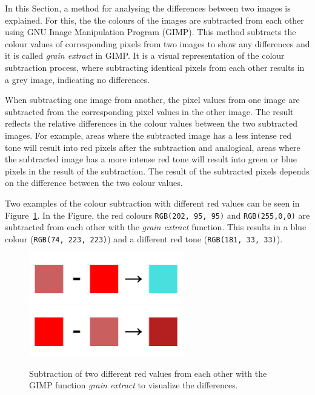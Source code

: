 \documentclass[../MasterThesis.tex]{subfiles}
\begin{document}
In this Section, a method for analysing the differences between two images is explained.
For this, the the colours of the images are subtracted from each other using GNU Image Manipulation Program (GIMP). 
This method subtracts the colour values of corresponding pixels from two images to show any differences and it is called \textit{grain extract} in GIMP. It is a visual representation of the colour subtraction process, where subtracting identical pixels from each other results in a grey image, indicating no differences.~\cite{gimp}


When subtracting one image from another, the pixel values from one image are subtracted from the corresponding pixel values in the other image. 
The result reflects the relative differences in the colour values between the two subtracted images. For example, areas where the subtracted image has a less intense red tone will result into red pixels after the subtraction and analogical, areas where the subtracted image has a more intense red tone will result into green or blue pixels in the result of the subtraction. The result of the subtracted pixels depends on the difference between the two colour values.

Two examples of the colour subtraction with different red values can be seen in Figure~\ref{figure:neonminuslight}. In the Figure, the red colours \texttt{RGB(202, 95, 95)} and \texttt{RGB(255,0,0)} are subtracted from each other with the \textit{grain extract} function. This results in a blue colour (\texttt{RGB(74, 223, 223)}) and a different red tone (\texttt{RGB(181, 33, 33)}). 






\begin{figure}[H]
	
	\centering
	
	\includegraphics[width=0.6\textwidth]{lightMINUSneon.png}
	\includegraphics[width=0.6\textwidth]{neonMINUSlight.png}
	
	\caption[Colour subtraction with GIMP function \textit{grain extract}.]{Subtraction of two different red values from each other with the GIMP function \textit{grain extract} to visualize the differences.}
	\label{figure:neonminuslight}
	
\end{figure}
\end{document}
